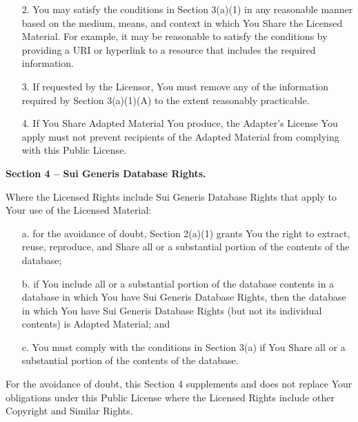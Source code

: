 \begin{enumerate}
\begin{enumerate}
		\item[2.] You may satisfy the conditions in Section 3(a)(1) in any
		reasonable manner based on the medium, means, and context in
		which You Share the Licensed Material. For example, it may be
		reasonable to satisfy the conditions by providing a URI or
		hyperlink to a resource that includes the required
		information.

		\item[3.] If requested by the Licensor, You must remove any of the
		information required by Section 3(a)(1)(A) to the extent
		reasonably practicable.

		\item[4.] If You Share Adapted Material You produce, the Adapter's
		License You apply must not prevent recipients of the Adapted
		Material from complying with this Public License.

	\end{enumerate}

\end{enumerate}


\textbf{Section 4 -- Sui Generis Database Rights.}

Where the Licensed Rights include Sui Generis Database Rights that
apply to Your use of the Licensed Material:

\begin{enumerate}

	\item[a.] for the avoidance of doubt, Section 2(a)(1) grants You the right
	to extract, reuse, reproduce, and Share all or a substantial
	portion of the contents of the database;

	\item[b.] if You include all or a substantial portion of the database
	contents in a database in which You have Sui Generis Database
	Rights, then the database in which You have Sui Generis Database
	Rights (but not its individual contents) is Adapted Material; and

	\item[c.] You must comply with the conditions in Section 3(a) if You Share
	all or a substantial portion of the contents of the database.

\end{enumerate}

For the avoidance of doubt, this Section 4 supplements and does not
replace Your obligations under this Public License where the Licensed
Rights include other Copyright and Similar Rights.


